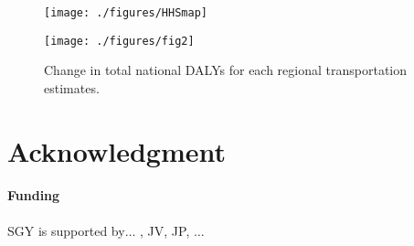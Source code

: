 \documentclass{bioinfo}
\begin{document}
\begin{figure}[t]
    \centerline{\texttt{[image: ./figures/HHSmap]}}
    \centerline{\texttt{[image: ./figures/fig2]}}
    \caption{Change in total national DALYs for each regional
      transportation estimates.}\label{dalyFigure}
\end{figure}


\section*{Acknowledgment}
\paragraph{Funding\textcolon} SGY is supported by$\ldots$ , JV, JP, $\ldots$

%
%


\end{document}
